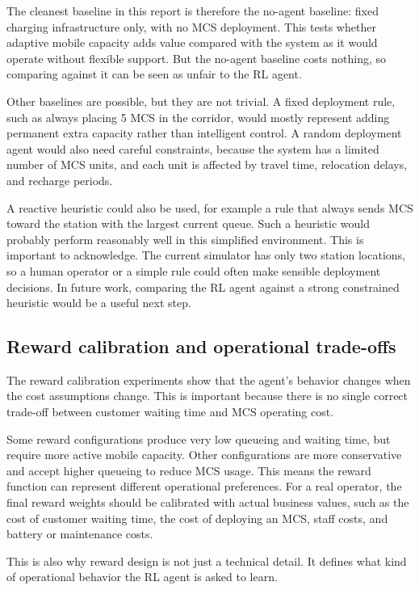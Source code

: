 \documentclass[11pt]{article}
\begin{document}
The cleanest baseline in this report is therefore the no-agent baseline:
fixed charging infrastructure only, with no MCS deployment. This tests
whether adaptive mobile capacity adds value compared with the system as
it would operate without flexible support. But the no-agent baseline
costs nothing, so comparing against it can be seen as unfair to the RL
agent.

Other baselines are possible, but they are not trivial. A fixed
deployment rule, such as always placing 5 MCS in the corridor, would
mostly represent adding permanent extra capacity rather than intelligent
control. A random deployment agent would also need careful constraints,
because the system has a limited number of MCS units, and each unit is
affected by travel time, relocation delays, and recharge periods.

A reactive heuristic could also be used, for example a rule that always
sends MCS toward the station with the largest current queue. Such a
heuristic would probably perform reasonably well in this simplified
environment. This is important to acknowledge. The current simulator has
only two station locations, so a human operator or a simple rule could
often make sensible deployment decisions. In future work, comparing the
RL agent against a strong constrained heuristic would be a useful next
step.

\subsection{Reward calibration and operational
trade-offs}\label{reward-calibration-and-operational-trade-offs}

The reward calibration experiments show that the agent's behavior
changes when the cost assumptions change. This is important because
there is no single correct trade-off between customer waiting time and
MCS operating cost.

Some reward configurations produce very low queueing and waiting time,
but require more active mobile capacity. Other configurations are more
conservative and accept higher queueing to reduce MCS usage. This means
the reward function can represent different operational preferences. For
a real operator, the final reward weights should be calibrated with
actual business values, such as the cost of customer waiting time, the
cost of deploying an MCS, staff costs, and battery or maintenance costs.

This is also why reward design is not just a technical detail. It
defines what kind of operational behavior the RL agent is asked to
learn.
\end{document}
